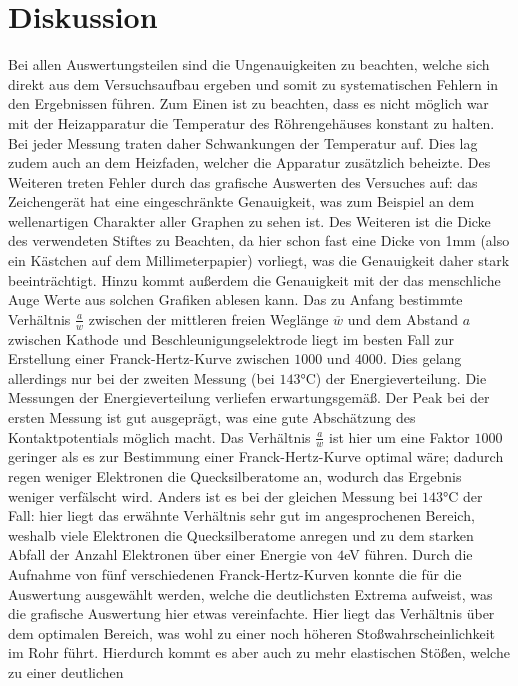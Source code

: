 \section{Diskussion}
\label{sec:Diskussion}
Bei allen Auswertungsteilen sind die Ungenauigkeiten zu beachten, welche sich direkt aus dem Versuchsaufbau ergeben und somit zu systematischen
Fehlern in den Ergebnissen führen. Zum Einen ist zu beachten, dass es nicht möglich war mit der Heizapparatur die Temperatur des 
Röhrengehäuses konstant zu halten. Bei jeder Messung traten daher Schwankungen der Temperatur auf. Dies lag zudem auch an dem Heizfaden, welcher
die Apparatur zusätzlich beheizte. Des Weiteren treten Fehler durch das grafische Auswerten des Versuches auf: das Zeichengerät hat eine eingeschränkte 
Genauigkeit, was zum Beispiel an dem wellenartigen Charakter aller Graphen zu sehen ist. Des Weiteren ist die Dicke des verwendeten Stiftes
zu Beachten, da hier schon fast eine Dicke von 1mm (also ein Kästchen auf dem Millimeterpapier) vorliegt, was die Genauigkeit daher stark 
beeinträchtigt. Hinzu kommt außerdem die Genauigkeit mit der das menschliche Auge Werte aus solchen Grafiken ablesen kann.
Das zu Anfang bestimmte Verhältnis $\frac{a}{w}$ zwischen der mittleren freien Weglänge $\overline{w}$ und dem Abstand $a$ zwischen Kathode und Beschleunigungselektrode
liegt im besten Fall zur Erstellung einer Franck-Hertz-Kurve zwischen $1000$ und $4000$. Dies gelang allerdings nur bei der zweiten Messung (bei $143$°C) der Energieverteilung.
Die Messungen der Energieverteilung verliefen erwartungsgemäß. Der Peak bei der ersten Messung ist gut ausgeprägt, was eine 
gute Abschätzung des Kontaktpotentials möglich macht. Das Verhältnis $\frac{a}{w}$ ist hier um eine Faktor $1000$ geringer als es zur Bestimmung
einer Franck-Hertz-Kurve optimal wäre; dadurch regen weniger Elektronen die Quecksilberatome an, wodurch das Ergebnis weniger verfälscht wird.
Anders ist es bei der gleichen Messung bei $143$°C der Fall: hier liegt das erwähnte Verhältnis sehr gut im angesprochenen Bereich, weshalb 
viele Elektronen die Quecksilberatome anregen und zu dem starken Abfall der Anzahl Elektronen über einer Energie von $4$eV führen. 
Durch die Aufnahme von fünf verschiedenen Franck-Hertz-Kurven konnte die für die Auswertung ausgewählt werden, welche die deutlichsten 
Extrema aufweist, was die grafische Auswertung hier etwas vereinfachte. Hier liegt das Verhältnis über dem optimalen Bereich, was wohl 
zu einer noch höheren Stoßwahrscheinlichkeit im Rohr führt. Hierdurch kommt es aber auch zu mehr elastischen Stößen, welche zu einer deutlichen 
